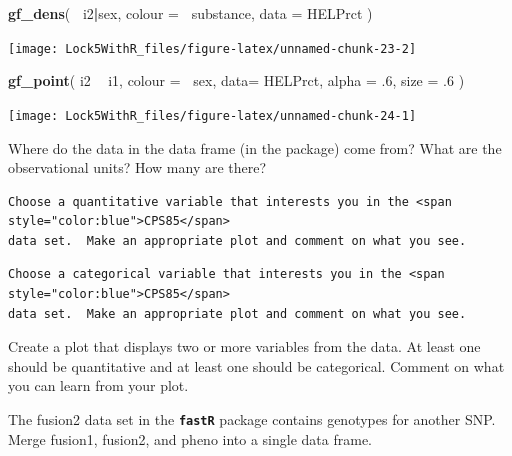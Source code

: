 \documentclass[]{book}
\newenvironment{Shaded}{\begin{snugshade}}{\end{snugshade}}
\newcommand{\DataTypeTok}[1]{\textcolor[rgb]{0.13,0.29,0.53}{#1}}
\newcommand{\FloatTok}[1]{\textcolor[rgb]{0.00,0.00,0.81}{#1}}
\newcommand{\KeywordTok}[1]{\textcolor[rgb]{0.13,0.29,0.53}{\textbf{#1}}}
\newcommand{\NormalTok}[1]{#1}
\newcommand{\OperatorTok}[1]{\textcolor[rgb]{0.81,0.36,0.00}{\textbf{#1}}}
\newcommand{\StringTok}[1]{\textcolor[rgb]{0.31,0.60,0.02}{#1}}
\begin{document}
\begin{Shaded}
\begin{Highlighting}[]
\KeywordTok{gf_dens}\NormalTok{( }\OperatorTok{~}\NormalTok{i2}\OperatorTok{|}\NormalTok{sex, }\DataTypeTok{colour =} \OperatorTok{~}\NormalTok{substance, }\DataTypeTok{data =}\NormalTok{ HELPrct )}
\end{Highlighting}
\end{Shaded}

\texttt{[image: Lock5WithR\_files/figure-latex/unnamed-chunk-23-2]}

\begin{Shaded}
\begin{Highlighting}[]
\KeywordTok{gf_point}\NormalTok{( i2 }\OperatorTok{~}\StringTok{ }\NormalTok{i1, }\DataTypeTok{colour =} \OperatorTok{~}\NormalTok{sex, }\DataTypeTok{data=}\NormalTok{ HELPrct, }\DataTypeTok{alpha =} \FloatTok{.6}\NormalTok{, }\DataTypeTok{size =} \FloatTok{.6}\NormalTok{ )}
\end{Highlighting}
\end{Shaded}

\texttt{[image: Lock5WithR\_files/figure-latex/unnamed-chunk-24-1]}

\begin{problem}
    \label{prob:CPS1}
    Where do the data in the  data frame (in the 
     package) come from?  What are the observational 
    units?  How many are there?
\end{problem}

\begin{verbatim}
Choose a quantitative variable that interests you in the <span style="color:blue">CPS85</span>
data set.  Make an appropriate plot and comment on what you see.
\end{verbatim}

\begin{verbatim}
Choose a categorical variable that interests you in the <span style="color:blue">CPS85</span>
data set.  Make an appropriate plot and comment on what you see.
\end{verbatim}

\begin{problem}
    \label{prob:CPSmulti}
    Create a plot that displays two or more variables from the 
     data.  At least one should be quantitative 
    and at least one should be categorical.
    Comment on what you can learn from your plot.
\end{problem}

The {fusion2} data set in the \textbf{\texttt{fastR}} package contains genotypes for
another SNP. Merge {fusion1}, {fusion2}, and {pheno} into a single data
frame.
\end{document}
